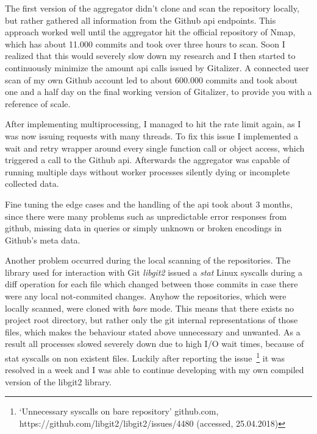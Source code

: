 The first version of the aggregator didn't clone and scan the repository locally, but rather gathered all information from the Github \ac{api} endpoints.
This approach worked well until the aggregator hit the official repository of Nmap, which has about 11.000 commits and took over three hours to scan.
Soon I realized that this would severely slow down my research and I then started to continuously minimize the amount \ac{api} calls issued by Gitalizer.
A connected user scan of my own Github account led to about 600.000 commits and took about one and a half day on the final working version of Gitalizer, to provide you with a reference of scale.

After implementing multiprocessing, I managed to hit the rate limit again, as I was now issuing requests with many threads.
To fix this issue I implemented a wait and retry wrapper around every single function call or object access, which triggered a call to the Github \ac{api}.
Afterwards the aggregator was capable of running multiple days without worker processes silently dying or incomplete collected data.

Fine tuning the edge cases and the handling of the \ac{api} took about 3 months, since there were many problems such as unpredictable error responses from github, missing data in queries or simply unknown or broken encodings in Github's meta data.


Another problem occurred during the local scanning of the repositories.
The library used for interaction with Git \emph{libgit2} issued a \emph{stat} Linux syscalls during a diff operation for each file which changed between those commits in case there were any local not-commited changes.
Anyhow the repositories, which were locally scanned, were cloned with \emph{bare} mode.
This means that there exists no project root directory, but rather only the git internal representations of those files, which makes the behaviour stated above unnecessary and unwanted.
As a result all processes slowed severely down due to high I/O wait times, because of stat syscalls on non existent files.
Luckily after reporting the issue~\footnote{`Unnecessary syscalls on bare repository' github.com, https://github.com/libgit2/libgit2/issues/4480 (accessed, 25.04.2018)} it was resolved in a week and I was able to continue developing with my own compiled version of the libgit2 library.
